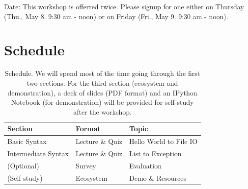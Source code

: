 \documentclass{tufte-handout}
\begin{document}
\noindent Date: This workshop is offerred twice. Please signup for 
one either on Thursday (Thu., May 8. 9:30 am - noon) or on Friday 
(Fri., May 9. 9:30 am - noon).

\section{Schedule}\label{sec:schedule}
\begin{table}[ht]
  \selectfont
  \begin{tabular}{lll}
    \toprule
    Section & Format & Topic \\
    \midrule
    Basic Syntax & Lecture \& Quiz & Hello World to File IO \\
    Intermediate Syntax & Lecture \& Quiz & List to Exception \\
    (Optional) & Survey & Evaluation \\
    (Self-study) & Ecosystem & Demo \& Resources \\
    \bottomrule
  \end{tabular}
  \caption{Schedule. 
    We will spend most of the time going through the first two
    sections. For the third section (ecosystem and demonstration),
    a deck of slides (PDF format) and an IPython Notebook (for
    demonstration) will be provided for self-study after the workshop.}
  \label{tab:Schedule}
\end{table}
\end{document}
